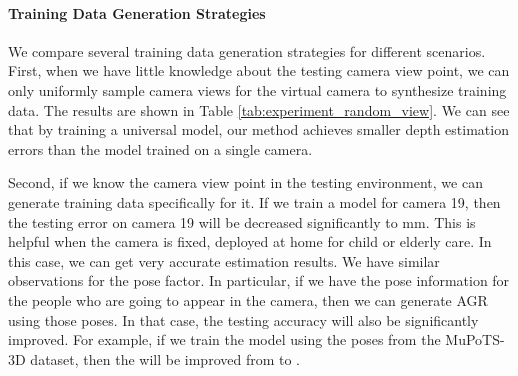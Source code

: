 \begin{table}
    \centering
    \caption{Ablation study on Root Estimation Network (REN) and Pose Estimation Network (PEN) in our method. We report the  and  (mm) on the test set of CMU Panoptic and MuPoTS-3D dataset. }
    \label{tab:ablation_effect}
\end{table}



\paragraph{\bf Training Data Generation Strategies} 
We compare several training data generation strategies for different scenarios. First, when we have little knowledge about the testing camera view point, we can only uniformly sample camera views for the virtual camera to synthesize training data. The results are shown in Table \ref{tab:experiment_random_view}. We can see that by training a universal model, our method achieves smaller depth estimation errors than the model trained on a single camera.

Second, if we know the camera view point in the testing environment, we can generate training data specifically for it. If we train a model for camera 19, then the testing error on camera 19 will be decreased significantly to mm. This is helpful when the camera is fixed, \eg deployed at home for child or elderly care. In this case, we can get very accurate estimation results. We have similar observations for the pose factor. In particular, if we have the pose information for the people who are going to appear in the camera, then we can generate AGR using those poses. In that case, the testing accuracy will also be significantly improved. For example, if we train the model using the poses from the MuPoTS-3D dataset, then the  will be improved from  to . 











